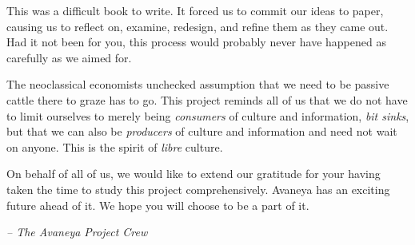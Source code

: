 

This was a difficult book to write. It forced us to commit our ideas to paper, causing us to reflect on, examine, redesign, and refine them as they came out. Had it not been for you, this process would probably never have happened as carefully as we aimed for.

The neoclassical economists unchecked assumption that we need to be passive cattle there to graze has to go. This project reminds all of us that we do not have to limit ourselves to merely being {\it consumers} of culture and information, {\it bit sinks}, but that we can also be {\it producers} of culture and information and need not wait on anyone. This is the spirit of {\it libre} culture.

On behalf of all of us, we would like to extend our gratitude for your having taken the time to study this project comprehensively. Avaneya has an exciting future ahead of it. We hope you will choose to be a part of it. 

\hskip 1.5cm {\it -- The Avaneya Project Crew}

\StopChapter

